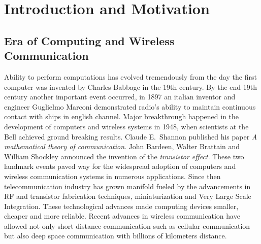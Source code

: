\chapter{Introduction and Motivation} \label{chap:introduction}

\section{Era of Computing and Wireless Communication}
Ability to perform computations has evolved tremendously from the day the first computer was invented by Charles Babbage in the 19th century. By the end 19th century another important event occurred, in 1897 an italian inventor and engineer Guglielmo Marconi demonstrated radio's ability to maintain continuous contact with ships in english channel. Major breakthrough happened in the development of computers and wireless systems in 1948, when scientists at the Bell achieved ground breaking results. Claude E.~Shannon published his paper \emph{A mathematical theory of communication}. John Bardeen, Walter Brattain and William Shockley announced the invention of the \emph{transistor effect}. These two landmark events paved way for the widespread adoption of computers and wireless communication systems in numerous applications. Since then telecommunication industry has grown manifold fueled by the advancements in RF and transistor fabrication techniques, miniaturization and Very Large Scale Integration. These technological advances made computing devices smaller, cheaper and more reliable. Recent advances in wireless communication have allowed not only short distance communication such as cellular communication but also deep space communication with billions of kilometers distance.  \newline

